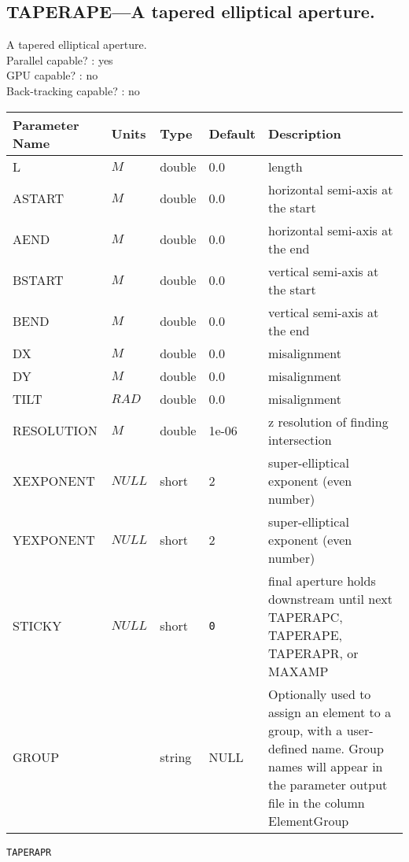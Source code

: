 \subsection{TAPERAPE---A tapered elliptical aperture.}
A tapered elliptical aperture.
\\
Parallel capable? : yes\\
GPU capable? : no\\
Back-tracking capable? : no\\
\begin{tabular}{|l|l|l|l|p{\descwidth}|} \hline
Parameter Name & Units & Type & Default & Description \\ \hline 
L & $M$ & double &  0.0 & length  \\ \hline 
ASTART & $M$ & double &  0.0 & horizontal semi-axis at the start  \\ \hline 
AEND & $M$ & double &  0.0 & horizontal semi-axis at the end  \\ \hline 
BSTART & $M$ & double &  0.0 & vertical semi-axis at the start  \\ \hline 
BEND & $M$ & double &  0.0 & vertical semi-axis at the end  \\ \hline 
DX & $M$ & double &  0.0 & misalignment  \\ \hline 
DY & $M$ & double &  0.0 & misalignment  \\ \hline 
TILT & $RAD$ & double &  0.0 & misalignment  \\ \hline 
RESOLUTION & $M$ & double &   1e-06 & z resolution of finding intersection  \\ \hline 
XEXPONENT & $NULL$ & short &   2               & super-elliptical exponent (even number)  \\ \hline 
YEXPONENT & $NULL$ & short &   2               & super-elliptical exponent (even number)  \\ \hline 
STICKY & $NULL$ & short &  \verb|0| & final aperture holds downstream until next TAPERAPC, TAPERAPE, TAPERAPR, or MAXAMP  \\ \hline 
GROUP &  & string & NULL & Optionally used to assign an element to a group, with a user-defined name.  Group names will appear in the parameter output file in the column ElementGroup  \\ \hline 
\end{tabular}

\newpage
\begin{center}{\Large\verb|TAPERAPR|}\end{center}
